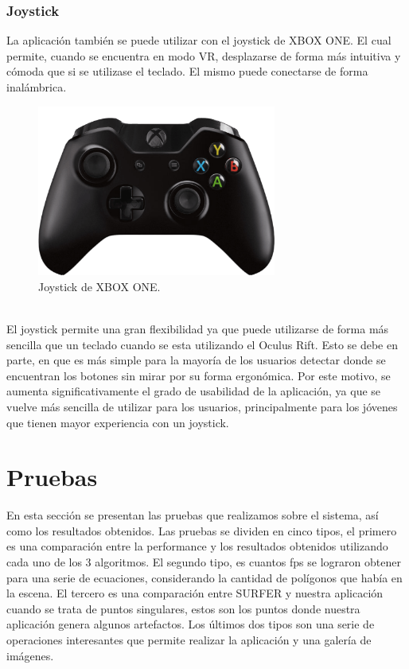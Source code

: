 \documentclass[12pt]{article}
\begin{document}
\subsubsection{Joystick}
La aplicación también se puede utilizar con el joystick de XBOX ONE. El cual permite, cuando se encuentra en modo VR, desplazarse de forma más intuitiva y cómoda que si se utilizase el teclado. El mismo puede conectarse de forma inalámbrica.\\
\begin{figure}[h!]
\includegraphics[width=0.7\textwidth,center]{joystickPosta.png}
\caption{Joystick de XBOX ONE.}
\end{figure}
\\El joystick permite una gran flexibilidad ya que puede utilizarse de forma más sencilla que un teclado cuando se esta utilizando el Oculus Rift. Esto se debe en parte, en que es más simple para la mayoría de los usuarios detectar donde se encuentran los botones sin mirar por su forma ergonómica. Por este motivo, se aumenta significativamente el grado de usabilidad de la aplicación, ya que se vuelve más sencilla de utilizar para los usuarios, principalmente para los jóvenes que tienen mayor experiencia con un joystick.
\clearpage
\section{Pruebas}
En esta sección se presentan las pruebas que realizamos sobre el sistema, así como los resultados obtenidos. Las pruebas se dividen en cinco tipos, el primero es una comparación entre la performance y los resultados obtenidos utilizando cada uno de los 3 algoritmos. El segundo tipo, es cuantos fps se lograron obtener para una serie de ecuaciones, considerando la cantidad de polígonos que había en la escena. El tercero es una comparación entre SURFER y nuestra aplicación cuando se trata de puntos singulares, estos son los puntos donde nuestra aplicación genera algunos artefactos. Los últimos dos tipos son una serie de operaciones interesantes que permite realizar la aplicación y una galería de imágenes.
\end{document}
